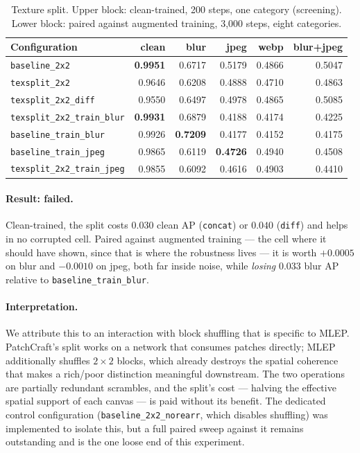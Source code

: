 \begin{table}[t]
  \centering
  \caption{Texture split. Upper block: clean-trained, 200 steps, one category
  (screening). Lower block: paired against augmented training, 3{,}000 steps,
  eight categories.}
  \label{tab:texture}
  \begin{tabular}{lrrrrr}
    \toprule
    Configuration & clean & blur & jpeg & webp & blur+jpeg \\
    \midrule
    \texttt{baseline\_2x2}            & \textbf{0.9951} & 0.6717 & 0.5179 & 0.4866 & 0.5047 \\
    \texttt{texsplit\_2x2}            & 0.9646 & 0.6208 & 0.4888 & 0.4710 & 0.4863 \\
    \texttt{texsplit\_2x2\_diff}      & 0.9550 & 0.6497 & 0.4978 & 0.4865 & 0.5085 \\
    \midrule
    \texttt{texsplit\_2x2\_train\_blur} & \textbf{0.9931} & 0.6879 & 0.4188 & 0.4174 & 0.4225 \\
    \texttt{baseline\_train\_blur}      & 0.9926 & \textbf{0.7209} & 0.4177 & 0.4152 & 0.4175 \\
    \texttt{baseline\_train\_jpeg}      & 0.9865 & 0.6119 & \textbf{0.4726} & 0.4940 & 0.4508 \\
    \texttt{texsplit\_2x2\_train\_jpeg} & 0.9855 & 0.6092 & 0.4616 & 0.4903 & 0.4410 \\
    \bottomrule
  \end{tabular}
\end{table}

\paragraph{Result: failed.} Clean-trained, the split costs $0.030$ clean AP
(\texttt{concat}) or $0.040$ (\texttt{diff}) and helps in no corrupted cell.
Paired against augmented training --- the cell where it should have shown, since
that is where the robustness lives --- it is worth $+0.0005$ on blur and
$-0.0010$ on jpeg, both far inside noise, while \emph{losing} $0.033$ blur AP
relative to \texttt{baseline\_train\_blur}.

\paragraph{Interpretation.} We attribute this to an interaction with block
shuffling that is specific to MLEP. PatchCraft's split works on a network that
consumes patches directly; MLEP additionally shuffles $2\times2$ blocks, which
already destroys the spatial coherence that makes a rich/poor distinction
meaningful downstream. The two operations are partially redundant scrambles, and
the split's cost --- halving the effective spatial support of each canvas --- is
paid without its benefit. The dedicated control configuration
(\texttt{baseline\_2x2\_norearr}, which disables shuffling) was implemented to
isolate this, but a full paired sweep against it remains outstanding and is the
one loose end of this experiment.

